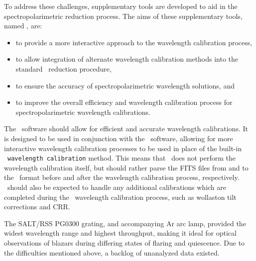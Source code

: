 To address these challenges, supplementary tools are developed to aid in the spectro\-polarimetric reduction process.
The aims of these supplementary tools, named \stops, are:
\begin{itemize}
    \item to provide a more interactive approach to the wavelength calibration process,
    \item to allow integration of alternate wavelength calibration methods into the standard \polsalt\ reduction procedure,
    \item to ensure the accuracy of spectropolarimetric wavelength solutions, and
    \item to improve the overall efficiency and wavelength calibration process for spectro\-polarimetric wavelength calibrations.
\end{itemize}

The \stops\ software should allow for efficient and accurate wavelength calibrations.
It is designed to be used in conjunction with the \polsalt\ software, allowing for more interactive wavelength calibration processes to be used in place of the built-in \polsalt\ \texttt{wavelength calibration} method.
This means that \stops\ does not perform the wavelength calibration itself, but should rather parse the \gls{FITS} files from and to the \polsalt\ format before and after the wavelength calibration process, respectively.
\stops\ should also be expected to handle any additional calibrations which are completed during the \polsalt\ wavelength calibration process, such as wollaston tilt corrections and \gls{CRR}.

The \gls{SALT}/\gls{RSS} PG$0300$ grating, and accompanying \gls{Ar} arc lamp, provided the widest wavelength range and highest throughput, making it ideal for optical observations of blazars during differing states of flaring and quiescence.
Due to the difficulties mentioned above, a backlog of unanalyzed data existed.


